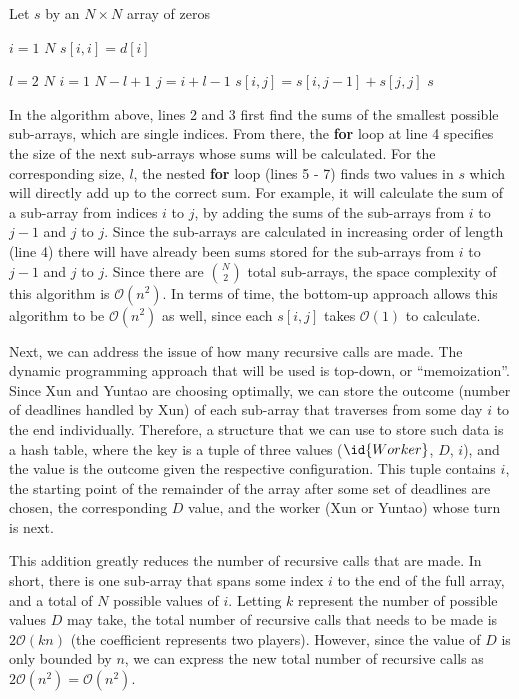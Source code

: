 \begin{spacing}{1.2}
    \begin{codebox}
        \li Let $s$ by an $N \times N$ array of zeros

        \li \For $i = 1$ \To $N$
        \Do
        \li $s[i, i] = d[i]$
        \End

        \li \For $l = 2$ \To $N$
        \Do
        \li \For $i = 1$ \To $N - l + 1$
        \Do
        \li $j = i + l - 1$
        \li $s[i, j] = s[i, j - 1] + s[j, j]$
        \End
        \End
        \li \Return $s$
    \end{codebox}
\end{spacing}
\vspace{5mm}
In the algorithm above, lines 2 and 3 first find the sums of the smallest possible sub-arrays, which are single indices.
From there, the \textbf{for} loop at line 4 specifies the size of the next sub-arrays whose sums will be calculated.
For the corresponding size, $l$, the nested \textbf{for} loop (lines 5 - 7) finds two values in $s$ which will directly add up to the correct sum.
For example, it will calculate the sum of a sub-array from indices $i$ to $j$, by adding the sums of the sub-arrays from $i$ to $j - 1$ and $j$ to $j$.
Since the sub-arrays are calculated in increasing order of length (line 4) there will have already been sums stored for the sub-arrays from $i$ to $j - 1$ and $j$ to $j$.
Since there are $\binom{N}{2}$ total sub-arrays, the space complexity of this algorithm is $\mathcal{O}(n^2)$.
In terms of time, the bottom-up approach allows this algorithm to be $\mathcal{O}(n^2)$ as well, since each $s[i, j]$ takes $\mathcal{O}(1)$ to calculate.

Next, we can address the issue of how many recursive calls are made.
The dynamic programming approach that will be used is top-down, or ``memoization''.
Since Xun and Yuntao are choosing optimally, we can store the outcome (number of deadlines handled by Xun) of each sub-array that traverses from some day $i$ to the end individually.
Therefore, a structure that we can use to store such data is a hash table, where the key is a tuple of three values ($\id{Worker}$, $D$, $i$), and the value is the outcome given the respective configuration.
This tuple contains $i$, the starting point of the remainder of the array after some set of deadlines are chosen, the corresponding $D$ value, and the worker (Xun or Yuntao) whose turn is next.

This addition greatly reduces the number of recursive calls that are made.
In short, there is one sub-array that spans some index $i$ to the end of the full array, and a total of $N$ possible values of $i$.
Letting $k$ represent the number of possible values $D$ may take, the total number of recursive calls that needs to be made is $2\mathcal{O}(kn)$ (the coefficient represents two players).
However, since the value of $D$ is only bounded by $n$, we can express the new total number of recursive calls as $2\mathcal{O}(n^2) = \mathcal{O}(n^2)$.

